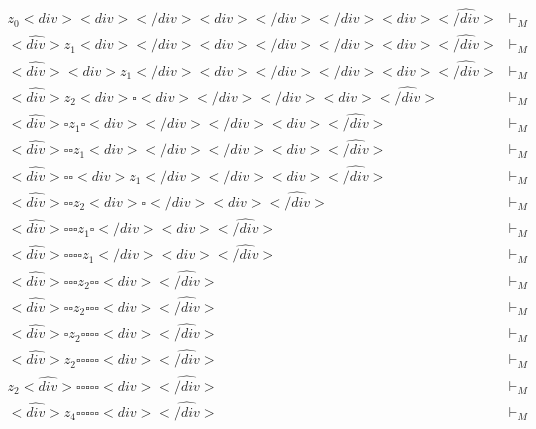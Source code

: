 \documentclass{report}
\begin{document}
\begin{eqnarray}
  z_0<div><div><\textit{/}div><div><\textit{/}div><\textit{/}div><div>\widehat{<\textit{/}div>} & \vdash_{M} \nonumber \\
  \widehat{<div>}z_1<div><\textit{/}div><div><\textit{/}div><\textit{/}div><div>\widehat{<\textit{/}div>} & \vdash_{M} \nonumber \\
  \widehat{<div>}<div>z_1<\textit{/}div><div><\textit{/}div><\textit{/}div><div>\widehat{<\textit{/}div>} & \vdash_{M} \nonumber \\
  \widehat{<div>}z_2<div>\square<div><\textit{/}div><\textit{/}div><div>\widehat{<\textit{/}div>} & \vdash_{M} \nonumber \\
  \widehat{<div>}\square z_1\square<div><\textit{/}div><\textit{/}div><div>\widehat{<\textit{/}div>} & \vdash_{M} \nonumber \\
  \widehat{<div>}\square\square z_1<div><\textit{/}div><\textit{/}div><div>\widehat{<\textit{/}div>} & \vdash_{M} \nonumber \\
  \widehat{<div>}\square\square<div>z_1<\textit{/}div><\textit{/}div><div>\widehat{<\textit{/}div>} & \vdash_{M} \nonumber \\
  \widehat{<div>}\square\square z_2<div>\square<\textit{/}div><div>\widehat{<\textit{/}div>} & \vdash_{M} \nonumber \\
  \widehat{<div>}\square\square\square z_1\square<\textit{/}div><div>\widehat{<\textit{/}div>} & \vdash_{M} \nonumber \\
  \widehat{<div>}\square\square\square\square z_1<\textit{/}div><div>\widehat{<\textit{/}div>} & \vdash_{M} \nonumber \\
  \widehat{<div>}\square\square\square z_2\square\square<div>\widehat{<\textit{/}div>} & \vdash_{M} \nonumber \\
  \widehat{<div>}\square\square z_2\square\square\square<div>\widehat{<\textit{/}div>} & \vdash_{M} \nonumber \\
  \widehat{<div>}\square z_2\square\square\square\square<div>\widehat{<\textit{/}div>} & \vdash_{M} \nonumber \\
  \widehat{<div>}z_2\square\square\square\square\square<div>\widehat{<\textit{/}div>} & \vdash_{M} \nonumber \\
  z_2\widehat{<div>}\square\square\square\square\square<div>\widehat{<\textit{/}div>} & \vdash_{M} \nonumber \\
  \widehat{<div>}z_4\square\square\square\square\square<div>\widehat{<\textit{/}div>} & \vdash_{M} \nonumber \\

\end{eqnarray}
\end{document}
